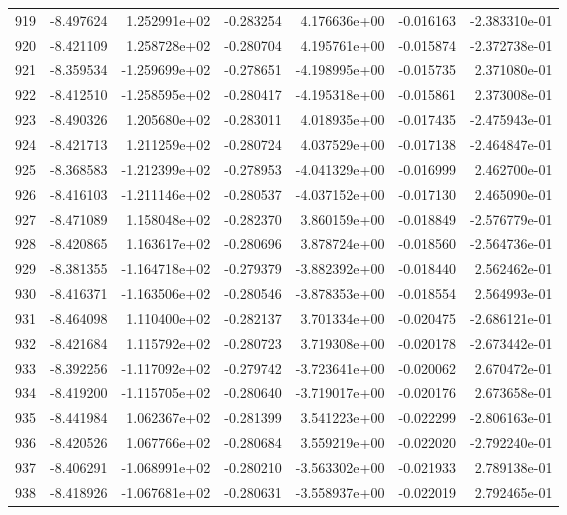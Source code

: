 \begin{tabular}{rrrrrrr}
 919 &  -8.497624 &  1.252991e+02 & -0.283254 &  4.176636e+00 &   -0.016163 & -2.383310e-01 \\
 920 &  -8.421109 &  1.258728e+02 & -0.280704 &  4.195761e+00 &   -0.015874 & -2.372738e-01 \\
 921 &  -8.359534 & -1.259699e+02 & -0.278651 & -4.198995e+00 &   -0.015735 &  2.371080e-01 \\
 922 &  -8.412510 & -1.258595e+02 & -0.280417 & -4.195318e+00 &   -0.015861 &  2.373008e-01 \\
 923 &  -8.490326 &  1.205680e+02 & -0.283011 &  4.018935e+00 &   -0.017435 & -2.475943e-01 \\
 924 &  -8.421713 &  1.211259e+02 & -0.280724 &  4.037529e+00 &   -0.017138 & -2.464847e-01 \\
 925 &  -8.368583 & -1.212399e+02 & -0.278953 & -4.041329e+00 &   -0.016999 &  2.462700e-01 \\
 926 &  -8.416103 & -1.211146e+02 & -0.280537 & -4.037152e+00 &   -0.017130 &  2.465090e-01 \\
 927 &  -8.471089 &  1.158048e+02 & -0.282370 &  3.860159e+00 &   -0.018849 & -2.576779e-01 \\
 928 &  -8.420865 &  1.163617e+02 & -0.280696 &  3.878724e+00 &   -0.018560 & -2.564736e-01 \\
 929 &  -8.381355 & -1.164718e+02 & -0.279379 & -3.882392e+00 &   -0.018440 &  2.562462e-01 \\
 930 &  -8.416371 & -1.163506e+02 & -0.280546 & -3.878353e+00 &   -0.018554 &  2.564993e-01 \\
 931 &  -8.464098 &  1.110400e+02 & -0.282137 &  3.701334e+00 &   -0.020475 & -2.686121e-01 \\
 932 &  -8.421684 &  1.115792e+02 & -0.280723 &  3.719308e+00 &   -0.020178 & -2.673442e-01 \\
 933 &  -8.392256 & -1.117092e+02 & -0.279742 & -3.723641e+00 &   -0.020062 &  2.670472e-01 \\
 934 &  -8.419200 & -1.115705e+02 & -0.280640 & -3.719017e+00 &   -0.020176 &  2.673658e-01 \\
 935 &  -8.441984 &  1.062367e+02 & -0.281399 &  3.541223e+00 &   -0.022299 & -2.806163e-01 \\
 936 &  -8.420526 &  1.067766e+02 & -0.280684 &  3.559219e+00 &   -0.022020 & -2.792240e-01 \\
 937 &  -8.406291 & -1.068991e+02 & -0.280210 & -3.563302e+00 &   -0.021933 &  2.789138e-01 \\
 938 &  -8.418926 & -1.067681e+02 & -0.280631 & -3.558937e+00 &   -0.022019 &  2.792465e-01 \\

\end{tabular}
